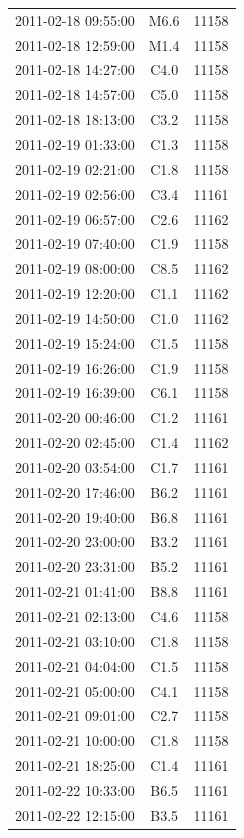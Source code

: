 \documentclass[referee,a4paper,12pt]{swsc}
\begin{document}
\begin{linenumbers}
\begin{longtable}{c|c|c}
		2011-02-18 09:55:00 & M6.6 & 11158 \\ 
		2011-02-18 12:59:00 & M1.4 & 11158 \\ 
		2011-02-18 14:27:00 & C4.0 & 11158 \\ 
		2011-02-18 14:57:00 & C5.0 & 11158 \\ 
		2011-02-18 18:13:00 & C3.2 & 11158 \\ 
		2011-02-19 01:33:00 & C1.3 & 11158 \\ 
		2011-02-19 02:21:00 & C1.8 & 11158 \\ 
		2011-02-19 02:56:00 & C3.4 & 11161 \\ 
		2011-02-19 06:57:00 & C2.6 & 11162 \\ 
		2011-02-19 07:40:00 & C1.9 & 11158 \\ 
		2011-02-19 08:00:00 & C8.5 & 11162 \\ 
		2011-02-19 12:20:00 & C1.1 & 11162 \\ 
		2011-02-19 14:50:00 & C1.0 & 11162 \\ 
		2011-02-19 15:24:00 & C1.5 & 11158 \\ 
		2011-02-19 16:26:00 & C1.9 & 11158 \\ 
		2011-02-19 16:39:00 & C6.1 & 11158 \\ 
		2011-02-20 00:46:00 & C1.2 & 11161 \\ 
		2011-02-20 02:45:00 & C1.4 & 11162 \\ 
		2011-02-20 03:54:00 & C1.7 & 11161 \\ 
		2011-02-20 17:46:00 & B6.2 & 11161 \\ 
		2011-02-20 19:40:00 & B6.8 & 11161 \\ 
		2011-02-20 23:00:00 & B3.2 & 11161 \\ 
		2011-02-20 23:31:00 & B5.2 & 11161 \\ 
		2011-02-21 01:41:00 & B8.8 & 11161 \\ 
		2011-02-21 02:13:00 & C4.6 & 11158 \\ 
		2011-02-21 03:10:00 & C1.8 & 11158 \\ 
		2011-02-21 04:04:00 & C1.5 & 11158 \\ 
		2011-02-21 05:00:00 & C4.1 & 11158 \\ 
		2011-02-21 09:01:00 & C2.7 & 11158 \\ 
		2011-02-21 10:00:00 & C1.8 & 11158 \\ 
		2011-02-21 18:25:00 & C1.4 & 11161 \\ 
		2011-02-22 10:33:00 & B6.5 & 11161 \\ 
		2011-02-22 12:15:00 & B3.5 & 11161 \\ 

\end{longtable}
\end{linenumbers}
\end{document}
